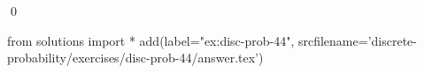 
\begin{ex} 
  \label{ex:disc-prob-44}
  
  \qed
\end{ex} 
\begin{python0}
from solutions import *
add(label="ex:disc-prob-44",
    srcfilename='discrete-probability/exercises/disc-prob-44/answer.tex') 
\end{python0}
